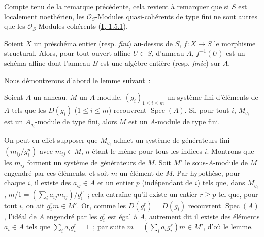 Compte tenu de la remarque précédente, cela revient à remarquer que si $S$ est
localement noethérien, les $\mathcal{O}_S$-Modules quasi-cohérents de type fini
ne sont autres que les $\mathcal{O}_S$-Modules cohérents
(\hyperref[I.1.5.1-fr]{\textbf{I}, 1.5.1}).

\begin{proposition}[6.1.4]
\label{II.6.1.4-fr}
Soient $X$ un préschéma entier \textup{(resp. \emph{fini})} au-dessus de $S$, $f:X\to S$ le
morphisme structural. Alors, pour tout ouvert affine $U\subset S$, d'anneau
$A$, $f^{-1}(U)$ est un schéma affine dont l'anneau $B$ est une algèbre
entière \textup{(resp. \emph{finie})} sur $A$.
\end{proposition}


Nous démontrerons d'abord le lemme suivant~:

\begin{lemma}[6.1.4.1]
\label{II.6.1.4.1-fr}
Soient $A$ un anneau, $M$ un $A$-module, $(g_i)_{1\leq i\leq m}$ un système
fini d'éléments de $A$ tels que les $D(g_i)$ ($1\leq i\leq m$) recouvrent
$\operatorname{Spec}(A)$. Si, pour tout $i$, $M_{g_i}$ est un
$A_{g_i}$-module de type fini, alors $M$ est un $A$-module de type fini.
\end{lemma}

On peut en effet supposer que $M_{g_i}$ admet un système de générateurs fini
$(m_{ij}/g_i^n)$ avec $m_{ij}\in M$, $n$ étant le même pour tous les indices
$i$. Montrons que les $m_{ij}$ forment un système de générateurs de $M$. Soit
$M'$ le sous-$A$-module de $M$ engendré par ces éléments, et soit $m$ un
élément de $M$. Par hypothèse, pour chaque $i$, il existe des $a_{ij}\in A$ et
un entier $p$ (indépendant de $i$) tels que, dans $M_{g_i}$,
$m/1=(\sum_i a_{ij}m_{ij})/g_i^p$~; cela entraîne qu'il existe un entier
$r\geq p$ tel que, pour tout $i$, on ait $g_i^r m\in M'$. Or, comme les
$D(g_i^r)=D(g_i)$ recouvrent $\operatorname{Spec}(A)$, l'idéal de $A$
engendré par les $g_i^r$ est égal à $A$, autrement dit il existe des éléments
$a_i\in A$ tels que $\sum_i a_i g_i^r=1$~; par suite
$m=(\sum_i a_i g_i^r)m\in M'$, d'où le lemme.

